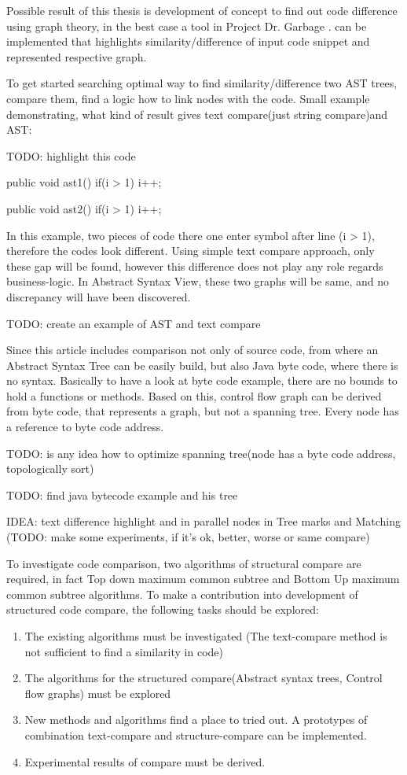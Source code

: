 \documentclass{report}
\begin{document}
Possible result of this thesis is development of concept to find out code difference using graph theory, in the best case a tool in Project Dr. Garbage \cite{drgarbage} . can be implemented that highlights similarity/difference of input code snippet and represented respective graph.

To get started searching optimal way to find similarity/difference two AST trees, compare them, find a logic how to link nodes with the code. Small example demonstrating, what kind of result gives text compare(just string compare)and AST:

TODO: highlight this code

	public void ast1(){
		if(i > 1) i++;\\
	}
	
	public void ast2(){
		if(i > 1) 
		i++;
	}
	
In this example, two pieces of code there one enter symbol after line (i > 1), therefore the codes look different. Using simple text compare approach, only these gap will be found, however this difference does not play any role regards business-logic. In Abstract Syntax View, these two graphs will be same, and no discrepancy will have been discovered.

TODO: create an example of AST and text compare
	
Since this article includes comparison not only of source code, from where an Abstract Syntax Tree can be easily build, but also Java byte code, where there is no syntax. Basically to have a look at byte code example, there are no bounds to hold a functions or methods. Based on this, 
control flow graph can be derived from byte code, that represents a graph, but not a spanning tree. Every node has a reference to byte code address.

TODO: is any idea how to optimize spanning tree(node has a byte code address, topologically sort)

TODO: find java bytecode example and his tree

IDEA: text difference highlight and in parallel nodes in Tree marks and Matching
(TODO: make some experiments, if it's ok, better, worse or same compare)

To investigate code comparison, two algorithms of structural compare are required, in fact Top down maximum common subtree and Bottom Up maximum common subtree algorithms.
To make a contribution into development of structured code compare, the following tasks should be explored:

\begin{enumerate}
  \item The existing algorithms must be investigated (The text-compare method is not sufficient to find a similarity in code)
  \item The algorithms for the structured compare(Abstract syntax trees, Control flow graphs) must be explored 
   \item New methods and algorithms find a place to tried out. A prototypes of combination text-compare and structure-compare can be implemented.
   \item Experimental results of compare must be derived.
\end{enumerate}
\end{document}
